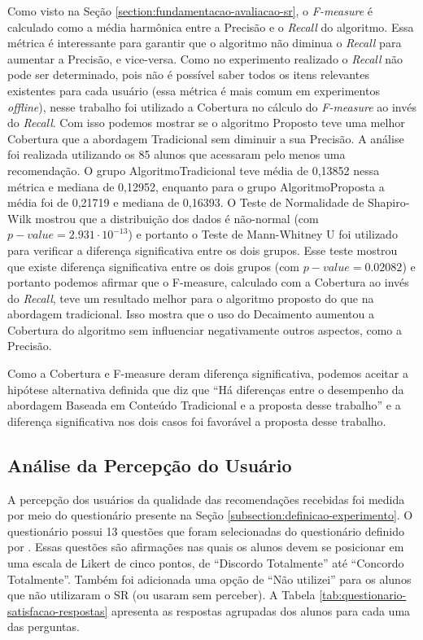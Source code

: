 Como visto na Seção \ref{section:fundamentacao-avaliacao-sr}, o \textit{F-measure} é calculado como a média harmônica entre
a Precisão e o \textit{Recall} do algoritmo. Essa métrica é interessante para garantir que o algoritmo não diminua o \textit{Recall}
para aumentar a Precisão, e vice-versa. Como no experimento realizado o \textit{Recall} não pode ser determinado, pois não
é possível saber todos os itens relevantes existentes para cada usuário (essa métrica é mais comum em experimentos
\textit{offline}), nesse trabalho foi utilizado a Cobertura no cálculo do \textit{F-measure} ao invés do \textit{Recall}.
Com isso podemos mostrar se o algoritmo Proposto teve uma melhor Cobertura que a abordagem Tradicional sem diminuir
a sua Precisão. A análise foi realizada utilizando os 85 alunos que acessaram pelo menos uma recomendação. O grupo AlgoritmoTradicional
teve média de 0,13852 nessa métrica e mediana de 0,12952, enquanto para o grupo AlgoritmoProposta a média foi de 0,21719
e mediana de 0,16393. O Teste de Normalidade de Shapiro-Wilk mostrou que a distribuição dos dados é não-normal (com $p-value = 2.931 \cdot 10^{-13}$)
e portanto o Teste de Mann-Whitney U foi utilizado para verificar a diferença significativa entre os dois grupos.
Esse teste mostrou que existe diferença significativa entre os dois grupos (com $p-value = 0.02082$) e portanto podemos afirmar que o F-measure,
calculado com a Cobertura ao invés do \textit{Recall}, teve um resultado melhor para o algoritmo proposto do que na abordagem
tradicional. Isso mostra que o uso do Decaimento aumentou a Cobertura do algoritmo sem influenciar negativamente outros
aspectos, como a Precisão.

Como a Cobertura e F-measure deram diferença significativa, podemos aceitar a hipótese alternativa definida
que diz que ``Há diferenças entre o desempenho da abordagem Baseada em Conteúdo Tradicional e a proposta desse trabalho''
e a diferença significativa nos dois casos foi favorável a proposta desse trabalho.

\subsection{Análise da Percepção do Usuário}\label{subsection:analise-questionario-satisfacao}

A percepção dos usuários da qualidade das recomendações recebidas foi medida por meio do questionário presente na Seção
\ref{subsection:definicao-experimento}. O questionário possui 13 questões que foram selecionadas do questionário
definido por . Essas questões são afirmações nas quais os alunos devem se posicionar em uma escala de
Likert de cinco pontos, de ``Discordo Totalmente'' até ``Concordo Totalmente''. Também foi adicionada uma opção de
``Não utilizei'' para os alunos que não utilizaram o SR (ou usaram sem perceber). A Tabela
\ref{tab:questionario-satisfacao-respostas} apresenta as respostas agrupadas dos alunos para cada uma das perguntas.

